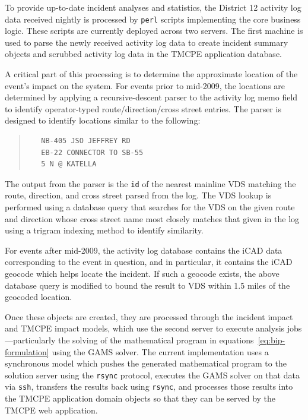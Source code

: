 \documentclass[12pt]{report}
\begin{document}
To provide up-to-date incident analyses and statistics, the District 12 activity
log data received nightly is processed by \texttt{perl} scripts implementing the
core business logic.  These scripts are currently deployed across two servers.
The first machine is used to parse the newly received activity log data to
create incident summary objects and scrubbed activity log data in the \ac{TMCPE}
application database.

A critical part of this processing is to determine the approximate location of
the event's impact on the system.  For events prior to mid-2009, the locations
are determined by applying a recursive-descent parser to the activity log memo
field to identify operator-typed route/direction/cross street entries.  The
parser is designed to identify locations similar to the following:
\begin{quote}
\begin{verbatim}
   NB-405 JSO JEFFREY RD
   EB-22 CONNECTOR TO SB-55
   5 N @ KATELLA
\end{verbatim}
\end{quote}
The output from the parser is the \texttt{id} of the nearest mainline \ac{VDS}
matching the route, direction, and cross street parsed from the log.  The
\ac{VDS} lookup is performed using a database query that searches for the
\ac{VDS} on the given route and direction whose cross street name most closely
matches that given in the log using a trigram indexing method to identify
similarity.

For events after mid-2009, the activity log database contains the \ac{iCAD} data
corresponding to the event in question, and in particular, it contains the
\ac{iCAD} geocode which helps locate the incident.  If such a geocode exists,
the above database query is modified to bound the result to \ac{VDS} within 1.5
miles of the geocoded location.

Once these objects are created, they are processed through the
incident impact and \ac{TMCPE} impact models, which use the second
server to execute analysis jobs---particularly the solving of the
mathematical program in equations~\eqref{eq:bip-formulation} using the
\ac{GAMS} solver.  The current implementation uses a synchronous model
which pushes the generated mathematical program to the solution server
using the \texttt{rsync} protocol, executes the \ac{GAMS} solver on
that data via \texttt{ssh}, transfers the results back using
\texttt{rsync}, and processes those results into the \ac{TMCPE}
application domain objects so that they can be served by the
\ac{TMCPE} web application.
\end{document}
